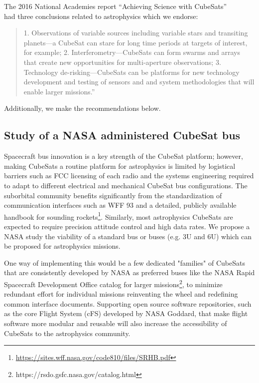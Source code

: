 \documentclass[12pt]{article}
\begin{document}
The 2016 National Academies report ``Achieving Science with CubeSats''\\ \cite{national_academies_of_sciences_achieving_2016}  had three conclusions related to astrophysics which we endorse: 
\begin{quote}
    
1. Observations of variable sources including variable stars and transiting planets—a CubeSat can stare for long time periods at targets of interest, for example; 2. Interferometry—CubeSats can form swarms and arrays that create new opportunities for multi-aperture observations; 3. Technology de-risking—CubeSats can be platforms for new technology development and testing of sensors and and system methodologies that will enable larger missions.''
\end{quote}



Additionally, we make the recommendations below.

\subsection{Study of a NASA administered CubeSat bus}
Spacecraft bus innovation is a key strength of the CubeSat platform; however, making CubeSats a routine platform for astrophysics is limited by logistical barriers such as FCC licensing of each radio and the systems engineering required to adapt to different electrical and mechanical CubeSat bus configurations.  The suborbital community benefits significantly from the standardization of communication interfaces such as WFF 93 and a detailed, publicly available handbook for sounding rockets\footnote{\url{https://sites.wff.nasa.gov/code810/files/SRHB.pdf}}. 
Similarly, most astrophysics CubeSats are expected to require precision attitude control and high data rates.
We propose a NASA study the viability of a standard bus or buses (e.g. 3U and 6U) which can be proposed for astrophysics missions.

One way of implementing this would be a few dedicated "families" of CubeSats that are consistently developed by NASA as preferred buses like the NASA Rapid Spacecraft Development Office catalog for larger missions\footnote{https://rsdo.gsfc.nasa.gov/catalog.html}, to minimize redundant effort for individual missions reinventing the wheel and redefining common interface documents. Supporting open source software repositories, such as the core Flight System (cFS) developed by NASA Goddard, that make flight software more modular and reusable will also increase the accessibility of CubeSats to the astrophysics community.%
\end{document}
